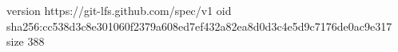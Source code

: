 version https://git-lfs.github.com/spec/v1
oid sha256:cc538d3c8e301060f2379a608ed7ef432a82ea8d0d3c4e5d9c7176de0ac9e317
size 388
